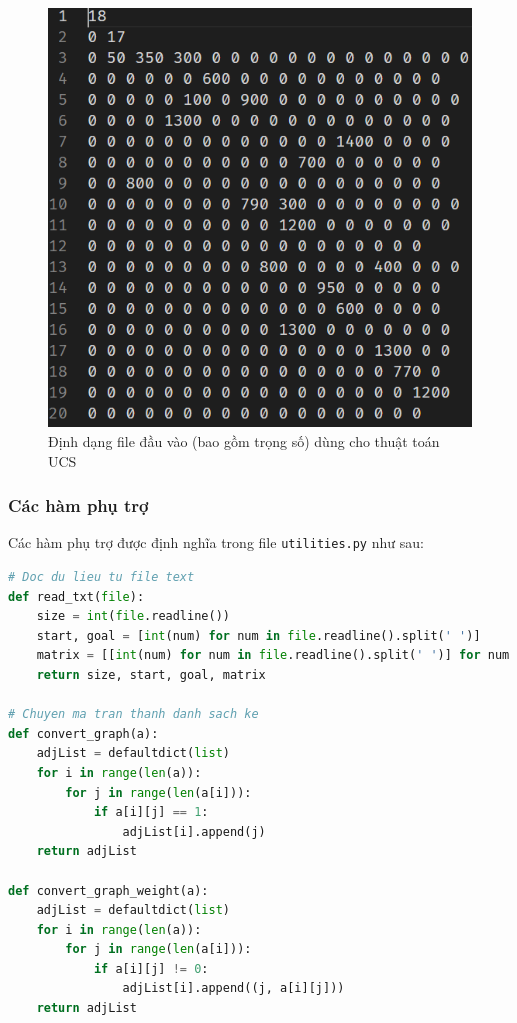 \documentclass[a4paper, 11pt]{article}
\begin{document}
\begin{figure}[h]
    \centering
    \includegraphics[]{input_ucs.png}
    \caption{Định dạng file đầu vào (bao gồm trọng số) dùng cho thuật toán UCS}
\end{figure}
\clearpage

\subsubsection{Các hàm phụ trợ}
Các hàm phụ trợ được định nghĩa trong file \lstinline{utilities.py} như sau:

\begin{lstlisting}[language=Python]
# Doc du lieu tu file text
def read_txt(file):
    size = int(file.readline())
    start, goal = [int(num) for num in file.readline().split(' ')]
    matrix = [[int(num) for num in file.readline().split(' ')] for num in range(size)]
    return size, start, goal, matrix

# Chuyen ma tran thanh danh sach ke
def convert_graph(a):
    adjList = defaultdict(list)
    for i in range(len(a)):
        for j in range(len(a[i])):
            if a[i][j] == 1:
                adjList[i].append(j)
    return adjList

def convert_graph_weight(a):
    adjList = defaultdict(list)
    for i in range(len(a)):
        for j in range(len(a[i])):
            if a[i][j] != 0:
                adjList[i].append((j, a[i][j]))
    return adjList
\end{lstlisting}
\end{document}
